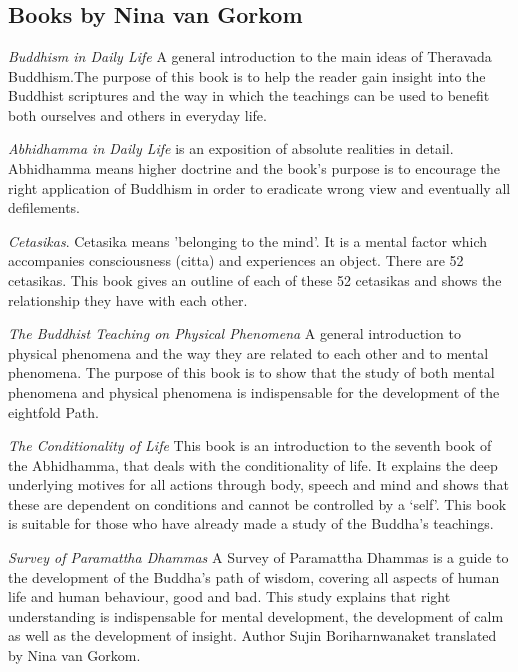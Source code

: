 \appendix
\chapter[Appendix]{}
\section*{Books by Nina van Gorkom}

\begin{description}

\item \emph{Buddhism in Daily Life} A general introduction to the main ideas
of Theravada Buddhism.The purpose of this book is to help the reader
gain insight into the Buddhist scriptures and the way in which the
teachings can be used to benefit both ourselves and others in everyday
life.

\item \emph{Abhidhamma in Daily Life} is an exposition of absolute realities
in detail. Abhidhamma means higher doctrine and the book's purpose
is to encourage the right application of Buddhism in order to eradicate
wrong view and eventually all defilements.

\item \emph{Cetasikas}. Cetasika means 'belonging to the mind'. It is a mental
factor which accompanies consciousness (citta) and experiences an
object. There are 52 cetasikas. This book gives an outline of each
of these 52 cetasikas and shows the relationship they have with each
other.

\item \emph{The Buddhist Teaching on Physical Phenomena} A general introduction
to physical phenomena and the way they are related to each other and
to mental phenomena. The purpose of this book is to show that the
study of both mental phenomena and physical phenomena is indispensable
for the development of the eightfold Path.

\item \emph{The Conditionality of Life}
This book is an introduction to the seventh book of the Abhidhamma,
that deals with the conditionality of life. It explains the deep underlying
motives for all actions through body, speech and mind and shows that these are
dependent on conditions and cannot be controlled by a ‘self’. This book is suitable for those who have already made a study of
the Buddha’s teachings.

\item \emph{Survey of Paramattha Dhammas} A Survey of Paramattha Dhammas is a guide to the development of the Buddha's path of wisdom, covering all aspects of human life and human behaviour, good and bad. This study explains that right understanding is indispensable for mental development, the development of calm as well as the development of
insight. Author Sujin Boriharnwanaket translated by Nina van Gorkom.


\end{description}
